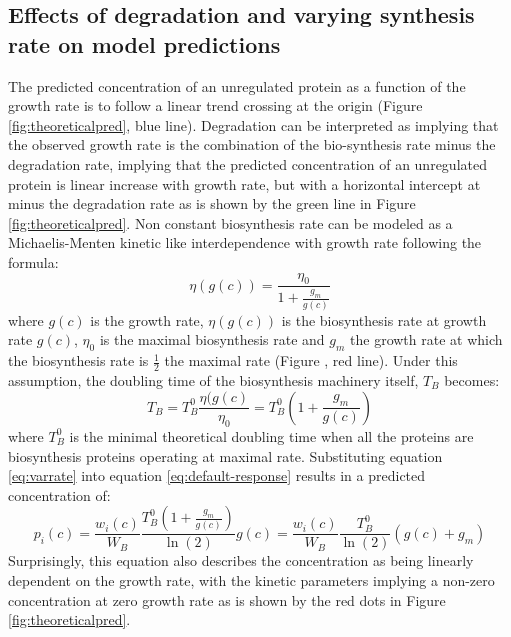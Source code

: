 \subsection{Effects of degradation and varying synthesis rate on model predictions}
The predicted concentration of an unregulated protein as a function of the growth rate is to follow a linear trend crossing at the origin (Figure \ref{fig:theoreticalpred}, blue line).
Degradation can be interpreted as implying that the observed growth rate is the combination of the bio-synthesis rate minus the degradation rate, implying that the predicted concentration of an unregulated protein is linear increase with growth rate, but with a horizontal intercept at minus the degradation rate as is shown by the green line in Figure \ref{fig:theoreticalpred}.
Non constant biosynthesis rate can be modeled as a Michaelis-Menten kinetic like interdependence with growth rate following the formula:
\begin{equation}
\eta(g(c))=\frac{\eta_0}{1+\frac{g_m}{g(c)}}
\end{equation}
where $g(c)$ is the growth rate, $\eta(g(c))$ is the biosynthesis rate at growth rate $g(c)$, $\eta_0$ is the maximal biosynthesis rate and $g_m$ the growth rate at which the biosynthesis rate is $\frac{1}{2}$ the maximal rate (Figure , red line).
Under this assumption, the doubling time of the biosynthesis machinery itself, $T_B$ becomes:
\begin{equation}
\label{eq:varrate}
T_B=T_B^0\frac{\eta(g(c)}{\eta_0}=T_B^0(1+\frac{g_m}{g(c)})
\end{equation}
where $T_B^0$ is the minimal theoretical doubling time when all the proteins are biosynthesis proteins operating at maximal rate.
Substituting equation \ref{eq:varrate} into equation \ref{eq:default-response} results in a predicted concentration of:
\begin{equation}
p_i(c)=\frac{w_i(c)}{W_B}\frac{T_B^0(1+\frac{g_m}{g(c)})}{\ln(2)}g(c) = \frac{w_i(c)}{W_B}\frac{T_B^0}{\ln(2)}(g(c)+g_m)
\end{equation}
Surprisingly, this equation also describes the concentration as being linearly dependent on the growth rate, with the kinetic parameters implying a non-zero concentration at zero growth rate as is shown by the red dots in Figure \ref{fig:theoreticalpred}.
